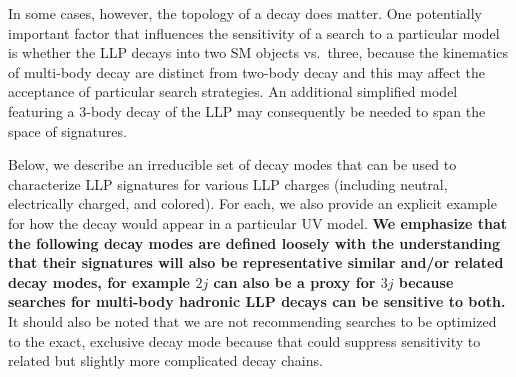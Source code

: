 In some cases, however, the topology of a decay does matter. One potentially important factor
 that influences the sensitivity of a search to a particular model is whether
 the LLP decays into two SM objects vs.~three, because the kinematics of multi-body
decay are distinct from two-body decay and this may affect the 
acceptance of particular search strategies.  An additional simplified model 
  featuring a 3-body decay of the LLP may consequently be needed to span
  the space of signatures.
  
Below, we describe an irreducible set of decay modes that can be used to
characterize LLP signatures for various LLP charges (including neutral, electrically charged, and colored). For each, we also provide an explicit example for how the decay would appear in a particular UV model. {\bf We  emphasize that the following decay modes are defined
  loosely with the understanding that their signatures will also be representative similar and/or related decay modes, for example
  $2j$ can also be a proxy for $3j$ because searches for
  multi-body hadronic LLP decays can be sensitive to both.} It
should also be noted that we are not recommending searches to be
optimized to the exact, exclusive decay mode because that could
suppress sensitivity to related but slightly more complicated decay chains.


